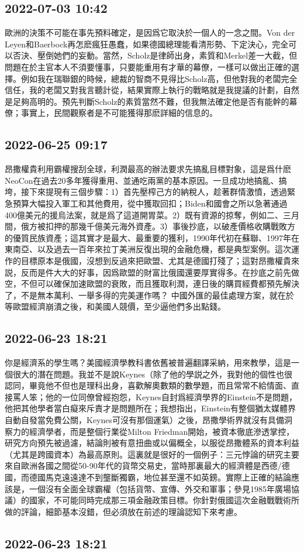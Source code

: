 \documentclass[twocolumn]{ctexart}
\begin{document}
\subsection*{2022-07-03 10:42}

歐洲的決策不可能在事先預料確定，是因爲它取決於一個人的一念之間。Von der Leyen和Baerbock再怎麽瘋狂愚蠢，如果德國總理能看清形勢、下定決心，完全可以否決、壓倒她們的妄動。當然，Scholz是律師出身，素質和Merkel差一大截，但問題在於主官本人不須要懂事，只要能重用有才華的幕僚，一樣可以做出正確的選擇。例如我在瑞聯銀的時候，總裁的智商不見得比Scholz高，但他對我的老闆完全信任，我的老闆又對我言聽計從，結果實際上執行的戰略就是我提議的計劃，自然是足夠高明的。預先判斷Scholz的素質當然不難，但我無法確定他是否有能幹的幕僚；事實上，民間觀察者是不可能獲得那麽詳細的信息的。
\subsection*{2022-06-25 09:17}

昂撒權貴利用霸權搜刮全球，利潤最高的辦法要求先搞亂目標對象，這是爲什麽NeoCon在過去20多年獲得重用、並通吃兩黨的基本原因。一旦成功地搞亂、搞垮，接下來提現有三個步驟：1）首先壓榨己方的納稅人，趁著群情激憤，透過緊急預算大幅投入軍工和其他費用，從中獲取回扣；Biden和國會之所以急著通過400億美元的援烏法案，就是爲了這道開胃菜。2）既有資源的掠奪，例如二、三月間，俄方被扣押的那幾千億美元海外資產。3）事後抄底，以破產價格收購戰敗方的優質民族資產；這其實才是最大、最重要的獲利，1990年代初在蘇聯、1997年在東南亞、以及過去一百年來拉丁美洲反復出現的金融危機，都是典型案例。這次運作的目標原本是俄國，沒想到反過來把歐盟、尤其是德國打殘了；這對昂撒權貴來説，反而是件大大的好事，因爲歐盟的財富比俄國還要厚實得多。在抄底之前先做空，不但可以確保加速歐盟的衰敗，而且獲取利潤，連日後的購買經費都預先解決了，不是無本萬利、一舉多得的完美運作嗎？
中國外匯的最佳處理方案，就在於等歐盟經濟崩潰之後，和美國人競價，至少逼他們多出點錢。
\subsection*{2022-06-23 18:21}
你是經濟系的學生嗎？美國經濟學教科書依舊被普遍翻譯采納，用來教學，這是一個很大的潛在問題。我並不是說Keynes（除了他的學説之外，我對他的個性也很認同，畢竟他不但也是理科出身，喜歡解奧數類的數學題，而且常常不給情面、直接罵人笨；他的一位同僚曾經抱怨，Keynes自封爲經濟學界的Einstein不是問題，他把其他學者當白癡來斥責才是問題所在；我想指出，Einstein有整個猶太媒體界自動自發當免費公關，Keynes可沒有那個運氣）之後，昂撒學術界就沒有具備洞察力的經濟學者，而是整個行業從Milton Friedman開始，被資本徹底滲透掌控，研究方向預先被過濾，結論則被有意扭曲或以偏概全，以服從昂撒體系的資本利益（尤其是跨國資本）為最高原則。這裏就是很好的一個例子：三元悖論的研究主要來自歐洲各國之間從50-90年代的貨幣交易史，當時那裏最大的經濟體是西德/德國，而德國馬克遠遠達不到壟斷獨霸，地位甚至還不如英鎊。實際上正確的結論應該是，一個沒有全面全球霸權（包括貨幣、宣傳、外交和軍事；參見1985年廣場協議）的國家，不可能同時完成那三項金融政策目標。你針對俄國這次金融戰戰術所做的評論，細節基本沒錯，但必須放在前述的理論認知下來考慮。\subsection*{2022-06-23 18:21}
\end{document}
